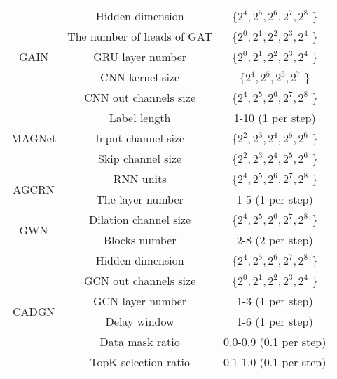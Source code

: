 \documentclass[lettersize,journal]{IEEEtran}
\begin{document}
\begin{table}[t!]
{\begin{tabular}{c c c}
			\multirow{5}{*}{GAIN} & Hidden dimension & \{$2^4, 2^5, 2^6, 2^7, 2^8$ \} \\
			~ & The number of heads of GAT & \{$2^0, 2^1, 2^2, 2^3, 2^4$ \} \\
			~ & GRU layer number & \{$2^0, 2^1, 2^2, 2^3, 2^4$ \} \\
			~ & CNN kernel size& \{$2^4, 2^5, 2^6, 2^7$ \} \\
			~ & CNN out channels size & \{$2^4, 2^5, 2^6, 2^7, 2^8$ \} \\
			\multirow{3}{*}{MAGNet} & Label length  & 1-10 (1 per step)	\\ 
			~ & Input channel size  & \{$2^2, 2^3, 2^4, 2^5, 2^6$ \}	\\
			~ & Skip channel size & \{$2^2, 2^3, 2^4, 2^5, 2^6$ \}	\\
			\multirow{2}{*}{{AGCRN}} & RNN units & \{$2^4, 2^5, 2^6, 2^7, 2^8$ \}	\\ 
			~ & The layer number & 1-5 (1 per step)	\\ 
			\multirow{2}{*}{{GWN}} & Dilation channel size & \{$2^4, 2^5, 2^6, 2^7, 2^8$ \}	\\ 
			~ & Blocks number & 2-8 (2 per step) \\ 
			\midrule
			\multirow{6}{*}{CADGN} & Hidden dimension & \{$2^4, 2^5, 2^6, 2^7, 2^8$ \} \\
			~ & GCN out channels size & \{$2^0, 2^1, 2^2, 2^3, 2^4$ \} \\
			~ & GCN layer number & 1-3 (1 per step) \\
			~ & Delay window & 1-6 (1 per step) \\
			~ & Data mask ratio & 0.0-0.9 (0.1 per step) \\
			~ & TopK selection ratio & 0.1-1.0 (0.1 per step) \\
			\bottomrule
			\bottomrule
		\end{tabular}
	}
	\vspace{-10pt}
\end{table}


	
\end{document}
